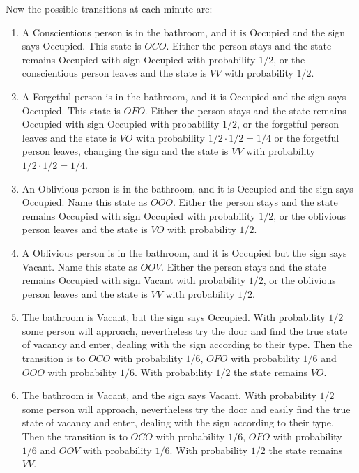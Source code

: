 \documentclass[12pt]{article}
\begin{document}
\begin{enumerate}
Now the possible transitions at each minute are:
\begin{enumerate}
    \item
        A Conscientious person is in the bathroom, and it is Occupied
        and the sign says Occupied.  This state is \( OCO \).  Either
        the person stays and the state remains Occupied with sign
        Occupied with probability \( 1/2 \), or the conscientious person
        leaves and the state is \( VV \) with probability \( 1/2 \).
    \item
        A Forgetful person is in the bathroom, and it is Occupied and
        the sign says Occupied.  This state is \( OFO \).  Either the
        person stays and the state remains Occupied with sign Occupied
        with probability \( 1/2 \), or the forgetful person leaves and
        the state is \( VO \) with probability \( 1/2 \cdot 1/2 = 1/4 \)
        or the forgetful person leaves, changing the sign and the state
        is \( VV \) with probability \( 1/2 \cdot 1/2 = 1/4 \).
    \item
        An Oblivious person is in the bathroom, and it is Occupied and
        the sign says Occupied.  Name this state as \( OOO \).  Either
        the person stays and the state remains Occupied with sign
        Occupied with probability \( 1/2 \), or the oblivious person
        leaves and the state is \( VO \) with probability \( 1/2 \).
    \item
        A Oblivious person is in the bathroom, and it is Occupied but
        the sign says Vacant.  Name this state as \( OOV \).  Either the
        person stays and the state remains Occupied with sign Vacant
        with probability \( 1/2 \), or the oblivious person leaves and
        the state is \( VV \) with probability \( 1/2 \).
    \item
        The bathroom is Vacant, but the sign says Occupied.  With
        probability \( 1/2 \) some person will approach, nevertheless
        try the door and find the true state of vacancy and enter,
        dealing with the sign according to their type.  Then the
        transition is to \( OCO \) with probability \( 1/6 \), \( OFO \)
        with probability \( 1/6 \) and \( OOO \) with probability \( 1/6
        \).  With probability \( 1/2 \) the state remains \( VO \).
    \item
        The bathroom is Vacant, and the sign says Vacant.  With
        probability \( 1/2 \) some person will approach, nevertheless
        try the door and easily find the true state of vacancy and
        enter, dealing with the sign according to their type.  Then the
        transition is to \( OCO \) with probability \( 1/6 \), \( OFO \)
        with probability \( 1/6 \) and \( OOV \) with probability \( 1/6
        \).  With probability \( 1/2 \) the state remains \( VV \).
\end{enumerate}


\end{enumerate}
\end{document}
